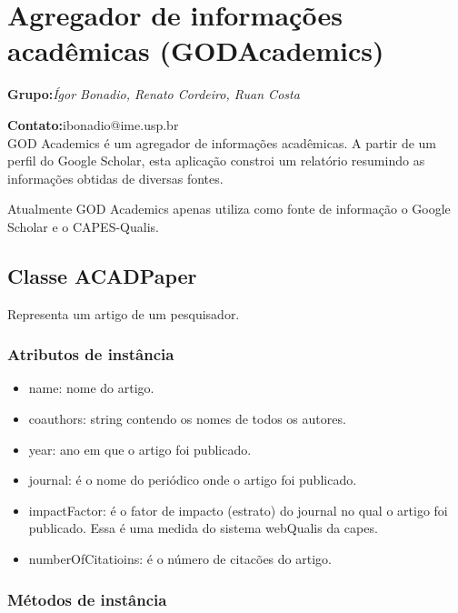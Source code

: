 \section{Agregador de informações acadêmicas (GODAcademics)}

\textbf{Grupo:}\textit{Ígor Bonadio, Renato Cordeiro, Ruan Costa}

\textbf{Contato:}ibonadio@ime.usp.br\\

GOD Academics é um agregador de informações acadêmicas. A partir de um perfil do Google Scholar, esta aplicação constroi um relatório resumindo as informações obtidas de diversas fontes.

Atualmente GOD Academics apenas utiliza como fonte de informação o Google Scholar e o CAPES-Qualis.

\subsection{Classe ACADPaper}

Representa um artigo de um pesquisador.

\subsubsection{Atributos de instância}

\begin{itemize}
  \item name: nome do artigo.

  \item coauthors: string contendo os nomes de todos os autores.

  \item year: ano em que o artigo foi publicado.

  \item journal: é o nome do periódico onde o artigo foi publicado.

  \item impactFactor: é o fator de impacto (estrato) do journal no qual o artigo foi publicado. Essa é uma  medida do sistema webQualis da capes.

  \item numberOfCitatioins: é o número de citacões do artigo.
\end{itemize}

\subsubsection{Métodos de instância}

